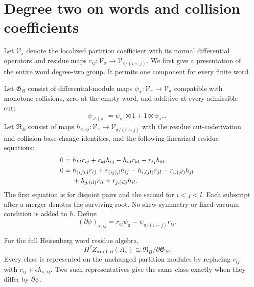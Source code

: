 \section{Degree two on words and collision coefficients}
\label{v4-arith:centers:sec:heis-two}

Let $\mathcal V_\pi$ denote the
localized partition coefficient
with its normal differential
operators and residue maps
$r_{ij}:\mathcal V_\pi\to
\mathcal V_{\pi/(i\sim j)}$.
We first give a presentation
of the entire word degree-two
group. It permits one component
for every finite word.

Let $\mathfrak G_B$ consist
of differential-module maps
$\psi_\pi:\mathcal V_\pi\to\mathcal V_\pi$
compatible with monotone
collisions, zero at the
empty word, and additive
at every admissible cut:
\[
 \psi_{\pi'\mid\pi''}
 =\psi_{\pi'}\boxtimes1+
       1\boxtimes\psi_{\pi''}.
\]
Let $\mathfrak R_B$ consist
of maps
$h_{\pi;ij}:\mathcal V_\pi\to
\mathcal V_{\pi/(i\sim j)}$
with the residue cut-coderivation
and collision-base-change
identities, and the following
linearized residue equations:
\begin{align}
 0={}&h_{kl}r_{ij}+r_{kl}h_{ij}
       -h_{ij}r_{kl}-r_{ij}h_{kl},
       \label{v4-arith:centers:eq:two-mergers}\\
 0={}&h_{(ij),l}r_{ij}+r_{(ij),l}h_{ij}
       -h_{i,(jl)}r_{jl}-r_{i,(jl)}h_{jl}
       \notag\\
    &+h_{j,(il)}r_{il}+r_{j,(il)}h_{il}.
       \label{v4-arith:centers:eq:three-mergers}
\end{align}
The first equation is for
disjoint pairs and the
second for $i<j<l$.
Each subscript after a
merger denotes the surviving
root. No skew-symmetry or
fixed-vacuum condition is
added to $h$.
Define
\[
 (\partial\psi)_{\pi;ij}
 =r_{ij}\psi_\pi-
       \psi_{\pi/(i\sim j)}r_{ij}.
\]

\begin{theorem}\label{v4-arith:centers:thm:word-two}
For the full Heisenberg word
residue algebra,
\[
 H^2Z_{\mathrm{word},B}(A_\kappa)
 \cong\mathfrak R_B/\partial\mathfrak G_B.
\]
Every class is represented
on the unchanged partition
modules by replacing
$r_{ij}$ with
$r_{ij}+\epsilon h_{\pi;ij}$.
Two such representatives
give the same class exactly
when they differ by
$\partial\psi$.
\end{theorem}

